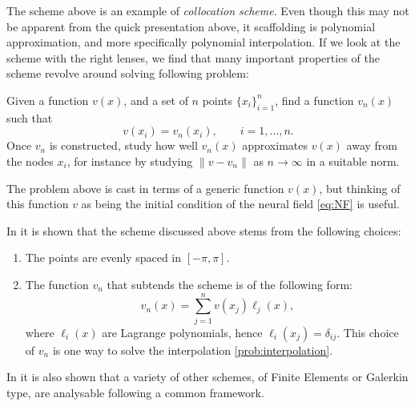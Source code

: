 \documentclass[a4paper]{siamart190516}
\begin{document}
The scheme above is an example of \textit{collocation scheme}. Even though this may
not be apparent from the quick presentation above, it scaffolding is polynomial
approximation, and more specifically polynomial interpolation. If we
look at the scheme with the right lenses, we find that many important properties of
the scheme revolve around solving following problem: 
\begin{problem}\label{prob:interpolation}
Given a function $v(x)$, and a set of $n$ points $\{ x_i \}_{i=1}^n$, find a function
$v_n(x)$ such that 
\[
  v(x_i) = v_n(x_i), \qquad i = 1,\ldots, n.
\]  
Once $v_n$ is constructed, study how well $v_n(x)$ approximates $v(x)$ away from the
nodes $x_i$, for instance by studying $\| v - v_n \|$ as $n \to \infty$ in a suitable
norm.
\end{problem}
The problem above is cast in terms of a generic function $v(x)$, but thinking of this
function $v$ as being the initial condition of the neural field \cref{eq:NF} is
useful.

In \cite{avitabileProjectionMethodsNeural2023} it is shown that the scheme discussed
above stems from the following choices: 
\begin{enumerate}
  \item The points are evenly spaced in $[-\pi,\pi]$.
  \item The function $v_n$ that subtends the scheme is of the following form:
    \begin{equation}\label{eq:LagrangeInterp}
      v_n(x) = \sum_{j=1}^{n} v(x_j) \ell_j(x), 
    \end{equation}
    where $\ell_i(x)$ are Lagrange polynomials, hence $\ell_i(x_j) = \delta_{ij}$.
    This choice of $v_n$ is one way to solve the interpolation
    \cref{prob:interpolation}.
\end{enumerate}
In \cite{avitabileProjectionMethodsNeural2023} it is also shown that a variety of
other schemes, of Finite Elements or Galerkin type, are analysable following a common
framework.
\end{document}
